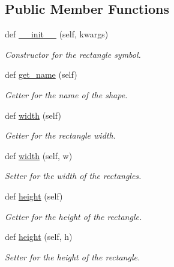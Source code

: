 \subsection*{Public Member Functions}
\begin{DoxyCompactItemize}
\item 
def \mbox{\hyperlink{classbridges_1_1rectangle_1_1_rectangle_aad5cb2fdd1da2686fb67de2150f55d42}{\+\_\+\+\_\+init\+\_\+\+\_\+}} (self, kwargs)
\begin{DoxyCompactList}\small\item\em Constructor for the rectangle symbol. \end{DoxyCompactList}\item 
def \mbox{\hyperlink{classbridges_1_1rectangle_1_1_rectangle_aad74ee17feb376967249296d34dfcb74}{get\+\_\+name}} (self)
\begin{DoxyCompactList}\small\item\em Getter for the name of the shape. \end{DoxyCompactList}\item 
def \mbox{\hyperlink{classbridges_1_1rectangle_1_1_rectangle_a862f1154bb5e73c1811c38e7871f93a5}{width}} (self)
\begin{DoxyCompactList}\small\item\em Getter for the rectangle width. \end{DoxyCompactList}\item 
def \mbox{\hyperlink{classbridges_1_1rectangle_1_1_rectangle_a6b4b58e7312278fdc5d314bd574096bc}{width}} (self, w)
\begin{DoxyCompactList}\small\item\em Setter for the width of the rectangles. \end{DoxyCompactList}\item 
def \mbox{\hyperlink{classbridges_1_1rectangle_1_1_rectangle_a74a2af961f5eb512ccd5f7faded6645c}{height}} (self)
\begin{DoxyCompactList}\small\item\em Getter for the height of the rectangle. \end{DoxyCompactList}\item 
def \mbox{\hyperlink{classbridges_1_1rectangle_1_1_rectangle_ad150b377d0bc9f08c85f7f16643a6bf4}{height}} (self, h)
\begin{DoxyCompactList}\small\item\em Setter for the height of the rectangle. \end{DoxyCompactList}\item 

\end{DoxyCompactItemize}
